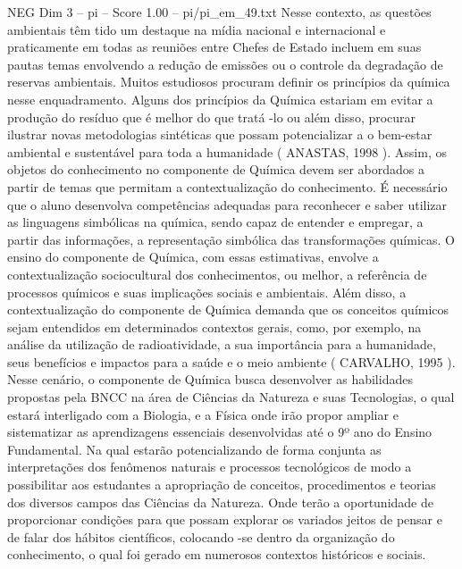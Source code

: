 \begin{textsample}{NEG Dim 3 – pi – Score 1.00 – pi/pi\_em\_49.txt}
Nesse contexto, as questões ambientais têm tido um destaque na mídia nacional e internacional e praticamente em todas as reuniões entre Chefes de Estado incluem em suas pautas temas envolvendo a redução de emissões ou o controle da degradação de reservas ambientais.
Muitos estudiosos procuram definir os princípios da química nesse enquadramento.
Alguns dos princípios da Química estariam em evitar a produção do resíduo que é melhor do que tratá -lo ou além disso, procurar ilustrar novas metodologias sintéticas que possam potencializar a o bem-estar ambiental e sustentável para toda a humanidade ( ANASTAS, 1998 ).
Assim, os objetos do conhecimento no componente de Química devem ser abordados a partir de temas que permitam a contextualização do conhecimento.
É necessário que o aluno desenvolva competências adequadas para reconhecer e saber utilizar as linguagens simbólicas na química, sendo capaz de entender e empregar, a partir das informações, a representação simbólica das transformações químicas.
O ensino do componente de Química, com essas estimativas, envolve a contextualização sociocultural dos conhecimentos, ou melhor, a referência de processos químicos e suas implicações sociais e ambientais.
Além disso, a contextualização do componente de Química demanda que os conceitos químicos sejam entendidos em determinados contextos gerais, como, por exemplo, na análise da utilização de radioatividade, a sua importância para a humanidade, seus benefícios e impactos para a saúde e o meio ambiente ( CARVALHO, 1995 ).
Nesse cenário, o componente de Química busca desenvolver as habilidades propostas pela BNCC na área de Ciências da Natureza e suas Tecnologias, o qual estará interligado com a Biologia, e a Física onde irão propor ampliar e sistematizar as aprendizagens essenciais desenvolvidas até o 9º ano do Ensino Fundamental.
Na qual estarão potencializando de forma conjunta as interpretações dos fenômenos naturais e processos tecnológicos de modo a possibilitar aos estudantes a apropriação de conceitos, procedimentos e teorias dos diversos campos das Ciências da Natureza.
Onde terão a oportunidade de proporcionar condições para que possam explorar os variados jeitos de pensar e de falar dos hábitos científicos, colocando -se dentro da organização do conhecimento, o qual foi gerado em numerosos contextos históricos e sociais.

\end{textsample}
